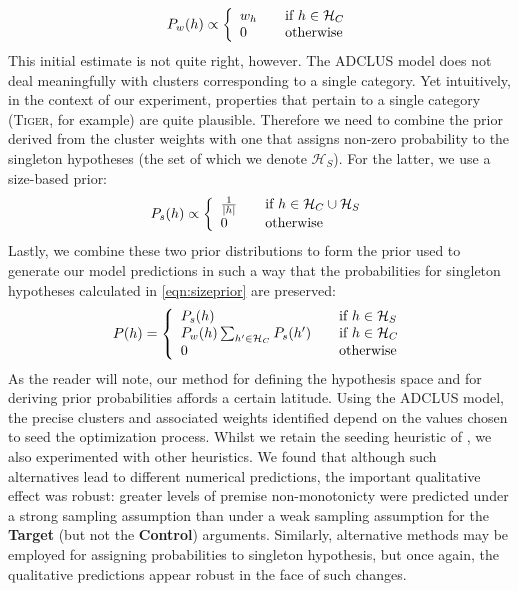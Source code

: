 \documentclass[doc,12pt]{apa}
\newcommand{\category}[1]{\textsc{#1}}
\newcommand{\bigh}{\mathcal{H}}
\begin{document}
\begin{equation}
P_w(h) \propto \left\{
  \begin{array}{l l}
    w_h & \quad \textrm{if $h \in \bigh_C$} \\
    0 & \quad \textrm{otherwise}
  \end{array} \right.
\end{equation}
This initial estimate is not quite right, however. The ADCLUS model does not deal meaningfully with clusters corresponding to a single category. Yet intuitively, in the context of our experiment, properties that pertain to a single category (\category{Tiger}, for example) are quite plausible. Therefore we need to combine the prior derived from the cluster weights with one that assigns non-zero probability to the singleton hypotheses (the set of which we denote $\bigh_S$). For the latter, we use a size-based prior:
\begin{equation}
\label{eqn:sizeprior}
P_s(h) \propto \left\{
  \begin{array}{l l}
    \frac{1}{|h|} & \quad \textrm{if $h \in \bigh_C \cup \bigh_S$} \\
    0 & \quad \textrm{otherwise}
  \end{array} \right.
\end{equation}
Lastly, we combine these two prior distributions to form the prior used to generate our model predictions in such a way that the probabilities for singleton hypotheses calculated in \cref{eqn:sizeprior} are preserved:
\begin{equation}
\label{eqn:finalprior}
P(h) = \left\{
  \begin{array}{l l}
    P_s(h) & \quad \textrm{if $h \in \bigh_S$} \\
    P_w(h) \sum_{h^\prime \in \bigh_C} P_s(h^\prime) & \quad \textrm{if $h \in \bigh_C$} \\
    0 & \quad \textrm{otherwise}
  \end{array} \right.
\end{equation}
As the reader will note, our method for defining the hypothesis space and for deriving prior probabilities affords a certain latitude. Using the ADCLUS model, the precise clusters and associated weights identified depend on the values chosen to seed the optimization process. Whilst we retain the seeding heuristic of , we also experimented with other heuristics. We found that although such alternatives lead to different numerical predictions, the important qualitative effect was robust: greater levels of premise non-monotonicty were predicted under a strong sampling assumption than under a weak sampling assumption for the {\bf Target} (but not the {\bf Control}) arguments. Similarly, alternative methods may be employed for assigning probabilities to singleton hypothesis, but once again, the qualitative predictions appear robust in the face of such changes.
\end{document}
